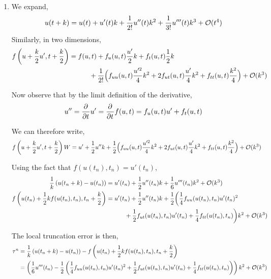 \documentclass[10pt]{article}
\begin{document}
\begin{solution}[Solution]
\begin{enumerate}[label=(\alph*)]
    \item
        We expand,
        \begin{align*}
            u(t+k) &= u(t) + u'(t)k + \dfrac{1}{2!}u''(t)k^2 + \dfrac{1}{3!}u'''(t)k^3 + \mathcal{O}(t^4) \\
        \end{align*}
        Similarly, in two dimensions,
        \begin{align*}
            f \left( u + \dfrac{k}{2} u', t+\dfrac{k}{2} \right)
            &= f(u,t) + f_u (u,t) \dfrac{u'}{2} k   + f_t(u,t) \dfrac{1}{2} k
            \\& \hspace{3em} + \dfrac{1}{2!} \Big( f_{uu}(u,t) \dfrac{u'^2}{4} k^2 + 2f_{ut}(u,t) \dfrac{u'}{4}k^2 + f_{tt}(u,t) \dfrac{k^2}{4} \Big) + \mathcal{O}(k^3)
        \end{align*}


        Now observe that by the limit definition of the derivative,
        \begin{align*}
            u'' = \frac{\partial^{}}{\partial t^{}} u' = \frac{\partial^{}}{\partial t^{}} f(u,t) = f_u(u,t)u' + f_t(u,t)
        \end{align*}

        We can therefore write,
        \begin{align*}
		        f \left( u + \dfrac{k}{2} u', t+\dfrac{k}{2} \right)W
            &= u' + \dfrac{1}{2}u''k
            + \dfrac{1}{2} \Big( f_{uu}(u,t) \dfrac{u'^2}{4} k^2 + 2f_{ut}(u,t) \dfrac{u'}{4}k^2 + f_{tt}(u,t) \dfrac{k^2}{4} \Big) + \mathcal{O}(k^3)
        \end{align*}

        Using the fact that \( f(u(t_n),t_n) = u'(t_n) \),
        \begin{align*}
            \dfrac{1}{k} \left( u(t_n + k) - u(t_n) \right) &= u'(t_n) + \dfrac{1}{2} u''(t_n) k + \dfrac{1}{6}u'''(t_n) k^2 + \mathcal{O}(k^3) \\
            f\left( u(t_n) + \dfrac{1}{2} k f(u(t_n),t_n) , t_n + \dfrac{k}{2} \right)
            &= u'(t_n) + \dfrac{1}{2}u''(t_n)k + \dfrac{1}{2} \bigg( \dfrac{1}{4}f_{uu}(u(t_n),t_n) u'(t_n)^2
            \\& \hspace{3em}+ \dfrac{1}{2}f_{ut}(u(t_n),t_n) u'(t_n)+  \dfrac{1}{4} f_{tt}(u(t_n),t_n) \bigg)k^2 + \mathcal{O}(k^3)
        \end{align*}

        The local truncation error is then,
        \begin{align*}
            \tau^n &= \dfrac{1}{k} \left( u(t_{n}+k) - u(t_n) \right) - f\left( u(t_n) + \dfrac{1}{2} k f(u(t_n),t_n) , t_n + \dfrac{k}{2} \right)
            \\&= \left( \dfrac{1}{6}u'''(t_n) - \dfrac{1}{2} \left( \dfrac{1}{4}f_{uu}(u(t_n),t_n) u'(t_n)^2 + \dfrac{1}{2}f_{ut}(u(t_n),t_n) u'(t_n)+  \dfrac{1}{4} f_{tt}(u(t_n),t_n) \right)  \right)k^2 + \mathcal{O}(k^3)
        \end{align*}


\end{enumerate}



\end{solution}
\end{document}
